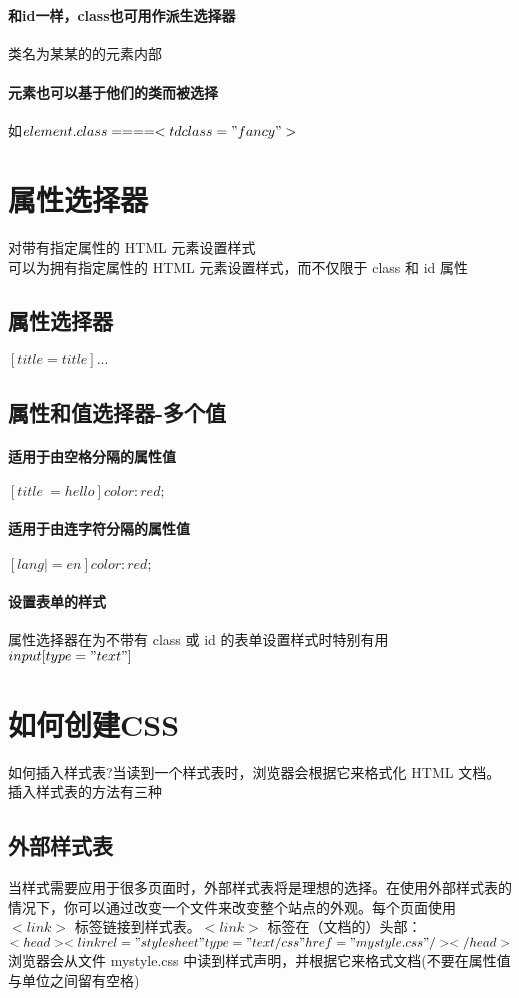 \documentclass[10pt,UTF8]{ctexart}
\begin{document}
\paragraph{和id一样，class也可用作派生选择器}类名为某某的的元素内部
\paragraph{元素也可以基于他们的类而被选择}如$element.class{}====<td class="fancy">$
\section{属性选择器}
对带有指定属性的 HTML 元素设置样式\\
可以为拥有指定属性的 HTML 元素设置样式，而不仅限于 class 和 id 属性
\subsection{属性选择器}
$[title=title]{...}$
\subsection{属性和值选择器-多个值}
\paragraph{适用于由空格分隔的属性值}$[title~=hello] { color:red; }$
\paragraph{适用于由连字符分隔的属性值}$[lang|=en] { color:red; }$
\paragraph{设置表单的样式}属性选择器在为不带有 class 或 id 的表单设置样式时特别有用$input[type="text"]{}$
\section{如何创建CSS}
如何插入样式表?当读到一个样式表时，浏览器会根据它来格式化 HTML 文档。插入样式表的方法有三种
\subsection{外部样式表}
当样式需要应用于很多页面时，外部样式表将是理想的选择。在使用外部样式表的情况下，你可以通过改变一个文件来改变整个站点的外观。每个页面使用 $<link>$ 标签链接到样式表。$<link>$ 标签在（文档的）头部：$<head><link rel="stylesheet" type="text/css" href="mystyle.css" /></head>$ 浏览器会从文件 mystyle.css 中读到样式声明，并根据它来格式文档(不要在属性值与单位之间留有空格)
\end{document}
